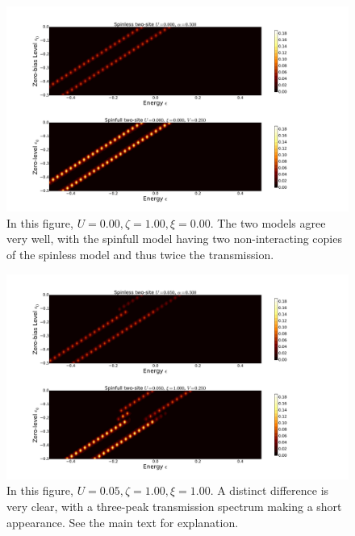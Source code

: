 \begin{figure}[h]
    \centering
    \includegraphics[height=.38\textheight]{pdf/map/transmap_u0_k0.pdf}
    \caption{In this figure, $U=0.00, \zeta=1.00, \xi=0.00$. The two models agree very well, with the spinfull model having two non-interacting copies of the spinless model and thus twice the transmission.}
    \label{fig:transmap00}
\end{figure}
\begin{figure}[h]
    \centering
    \includegraphics[height=.38\textheight]{pdf/map/transmap_u1_k2.pdf}
    \caption{In this figure, $U=0.05, \zeta=1.00, \xi=1.00$. A distinct difference is very clear, with a three-peak transmission spectrum making a short appearance. See the main text for explanation.}
    \label{fig:transmap12}
\end{figure}
